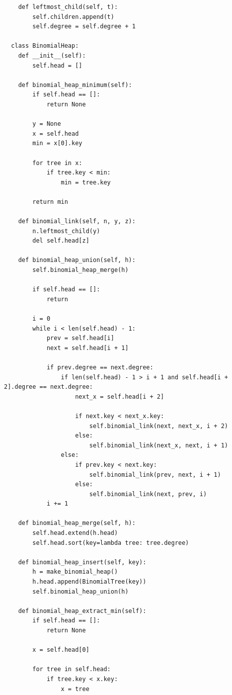 \documentclass{article}
\begin{document}
\begin{enumerate}
\begin{enumerate}
\begin{lstlisting}
    def leftmost_child(self, t):
        self.children.append(t)
        self.degree = self.degree + 1

  class BinomialHeap:
    def __init__(self):
        self.head = []

    def binomial_heap_minimum(self):
        if self.head == []:
            return None
        
        y = None
        x = self.head
        min = x[0].key

        for tree in x:
            if tree.key < min:
                min = tree.key                
        
        return min

    def binomial_link(self, n, y, z):
        n.leftmost_child(y)
        del self.head[z]        

    def binomial_heap_union(self, h):
        self.binomial_heap_merge(h)
        
        if self.head == []:
            return
        
        i = 0
        while i < len(self.head) - 1:
            prev = self.head[i]
            next = self.head[i + 1]

            if prev.degree == next.degree:
                if len(self.head) - 1 > i + 1 and self.head[i + 2].degree == next.degree:                    
                    next_x = self.head[i + 2]
                    
                    if next.key < next_x.key:
                        self.binomial_link(next, next_x, i + 2)
                    else:
                        self.binomial_link(next_x, next, i + 1)
                else:
                    if prev.key < next.key:
                        self.binomial_link(prev, next, i + 1)
                    else:
                        self.binomial_link(next, prev, i)            
            i += 1

    def binomial_heap_merge(self, h):
        self.head.extend(h.head)
        self.head.sort(key=lambda tree: tree.degree)

    def binomial_heap_insert(self, key):
        h = make_binomial_heap()
        h.head.append(BinomialTree(key))
        self.binomial_heap_union(h)        

    def binomial_heap_extract_min(self):
        if self.head == []:
            return None

        x = self.head[0]
        
        for tree in self.head:
            if tree.key < x.key:
                x = tree
        

\end{lstlisting}
\end{enumerate}
\end{enumerate}
\end{document}
